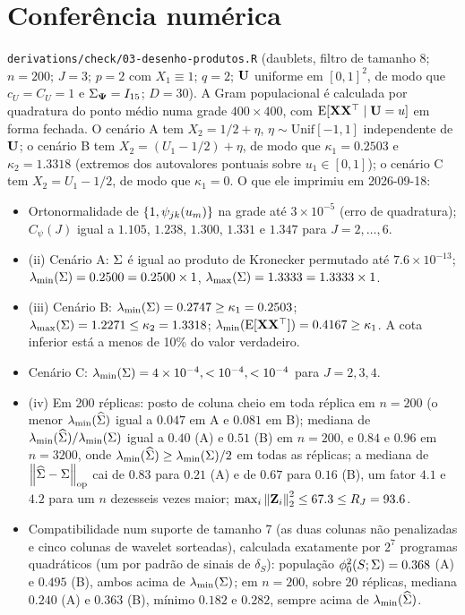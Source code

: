 \documentclass[11pt]{article}
\newcommand{\bPsi}{\boldsymbol{\Psi}}
\newcommand{\lmin}{\lambda_{\min}}
\newcommand{\lmax}{\lambda_{\max}}
\newcommand{\opnorm}[1]{\left\lVert #1 \right\rVert_{\mathrm{op}}}
\begin{document}
\section*{Conferência numérica}

\texttt{derivations/check/03-desenho-produtos.R} (daublets, filtro de tamanho 8; $n = 200$; $J = 3$; $p = 2$ com
$X_1 \equiv 1$; $q = 2$; $\mathbf{U}$ uniforme em $[0,1]^2$, de modo que $c_U = C_U = 1$ e $\Gram_{\bPsi} = I_{15}$; $D = 30$).
A Gram populacional é calculada por quadratura do ponto médio numa grade $400 \times 400$, com
$\mathrm{E}[\mathbf{X}\mathbf{X}^{\top}\mid\mathbf{U} = u]$ em forma fechada. O cenário A tem $X_2 = 1/2 + \eta$, $\eta \sim \mathrm{Unif}[-1,1]$
independente de $\mathbf{U}$; o cenário B tem $X_2 = (U_1 - 1/2) + \eta$, de modo que $\kappa_1 = 0.2503$ e
$\kappa_2 = 1.3318$ (extremos dos autovalores pontuais sobre $u_1 \in [0,1]$); o cenário C tem
$X_2 = U_1 - 1/2$, de modo que $\kappa_1 = 0$. O que ele imprimiu em 2026-09-18:
\begin{itemize}[leftmargin=*]
    \item Ortonormalidade de $\{1, \psi_{jk}(u_{m})\}$ na grade até $3 \times 10^{-5}$ (erro de quadratura);
    $C_\psi(J)$ igual a $1.105$, $1.238$, $1.300$, $1.331$ e $1.347$ para $J = 2, \ldots, 6$.
    \item (ii) Cenário A: $\Sigma$ é igual ao produto de Kronecker permutado até $7.6 \times 10^{-13}$;
    $\lmin(\Gram) = 0.2500 = 0.2500 \times 1$, $\lmax(\Gram) = 1.3333 = 1.3333 \times 1$.
    \item (iii) Cenário B: $\lmin(\Gram) = 0.2747 \ge \kappa_1 = 0.2503$; $\lmax(\Gram) = 1.2271 \le \kappa_2 = 1.3318$;
    $\lmin(\E[\bX\bX\T]) = 0.4167 \ge \kappa_1$. A cota inferior está a menos de 10\% do valor verdadeiro.
    \item Cenário C: $\lmin(\Gram) = 4 \times 10^{-4}, < 10^{-4}, < 10^{-4}$ para $J = 2, 3, 4$.
    \item (iv) Em 200 réplicas: posto de coluna cheio em toda réplica em $n = 200$ (o menor
    $\lmin(\Gramhat)$ igual a $0.047$ em A e $0.081$ em B); mediana de $\lmin(\Gramhat)/\lmin(\Gram)$ igual a $0.40$ (A) e
    $0.51$ (B) em $n = 200$, e $0.84$ e $0.96$ em $n = 3200$, onde $\lmin(\Gramhat) \ge \lmin(\Gram)/2$ em todas as
    réplicas; a mediana de $\opnorm{\Gramhat - \Gram}$ cai de $0.83$ para $0.21$ (A) e de $0.67$ para $0.16$ (B), um
    fator $4.1$ e $4.2$ para um $n$ dezesseis vezes maior; $\max_i\left\lVert \mathbf{Z}_i \right\rVert_2^2 \le 67.3 \le R_J = 93.6$.
    \item Compatibilidade num suporte de tamanho 7 (as duas colunas não penalizadas e cinco colunas de wavelet
    sorteadas), calculada exatamente por $2^7$ programas quadráticos (um por padrão de sinais de $\delta_S$):
    população $\phi_{0}^2(S;\Sigma) = 0.368$ (A) e $0.495$ (B), ambos acima de $\lmin(\Gram)$; em $n = 200$, sobre 20
    réplicas, mediana $0.240$ (A) e $0.363$ (B), mínimo $0.182$ e $0.282$, sempre acima de $\lmin(\Gramhat)$.
\end{itemize}
\end{document}
